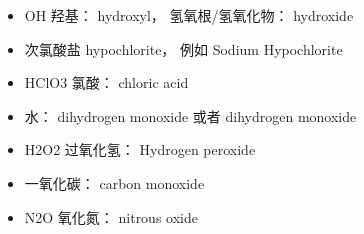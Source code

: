 

\begin{issues}
\issueDraft
\end{issues}

\begin{itemize}
\item OH 羟基： hydroxyl，  氢氧根/氢氧化物： hydroxide
\item 次氯酸盐 hypochlorite， 例如 Sodium Hypochlorite
\item HClO3 氯酸： chloric acid
\item 水： dihydrogen monoxide 或者 dihydrogen monoxide
\item H2O2 过氧化氢： Hydrogen peroxide
\item 一氧化碳： carbon monoxide
\item N2O 氧化氮： nitrous oxide
\end{itemize}
